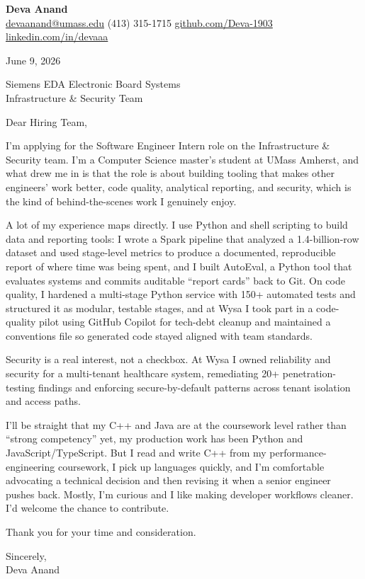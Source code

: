 \documentclass[letterpaper,11pt]{article}
\begin{document}
\begin{center}
  {\LARGE \bfseries \textcolor{ResumeNavy}{Deva Anand}} \\[3pt]
  {\small
  \href{mailto:devaanand@umass.edu}{devaanand@umass.edu} \enspace\textbar\enspace
  (413) 315-1715 \enspace\textbar\enspace
  \href{https://github.com/Deva-1903}{github.com/Deva-1903} \enspace\textbar\enspace
  \href{https://linkedin.com/in/devaaa/}{linkedin.com/in/devaaa}}
\end{center}
\vspace{6pt}

June 9, 2026

\vspace{2pt}
Siemens EDA \textemdash{} Electronic Board Systems \\
Infrastructure \& Security Team

\vspace{6pt}
Dear Hiring Team,

I'm applying for the Software Engineer Intern role on the Infrastructure \& Security team. I'm a Computer Science master's student at UMass Amherst, and what drew me in is that the role is about building tooling that makes other engineers' work better, code quality, analytical reporting, and security, which is the kind of behind-the-scenes work I genuinely enjoy.

A lot of my experience maps directly. I use Python and shell scripting to build data and reporting tools: I wrote a Spark pipeline that analyzed a 1.4-billion-row dataset and used stage-level metrics to produce a documented, reproducible report of where time was being spent, and I built AutoEval, a Python tool that evaluates systems and commits auditable ``report cards'' back to Git. On code quality, I hardened a multi-stage Python service with 150+ automated tests and structured it as modular, testable stages, and at Wysa I took part in a code-quality pilot using GitHub Copilot for tech-debt cleanup and maintained a conventions file so generated code stayed aligned with team standards.

Security is a real interest, not a checkbox. At Wysa I owned reliability and security for a multi-tenant healthcare system, remediating 20+ penetration-testing findings and enforcing secure-by-default patterns across tenant isolation and access paths.

I'll be straight that my C++ and Java are at the coursework level rather than ``strong competency'' yet, my production work has been Python and JavaScript/TypeScript. But I read and write C++ from my performance-engineering coursework, I pick up languages quickly, and I'm comfortable advocating a technical decision and then revising it when a senior engineer pushes back. Mostly, I'm curious and I like making developer workflows cleaner. I'd welcome the chance to contribute.

\vspace{4pt}
Thank you for your time and consideration.

\vspace{8pt}
Sincerely, \\
Deva Anand
\end{document}
